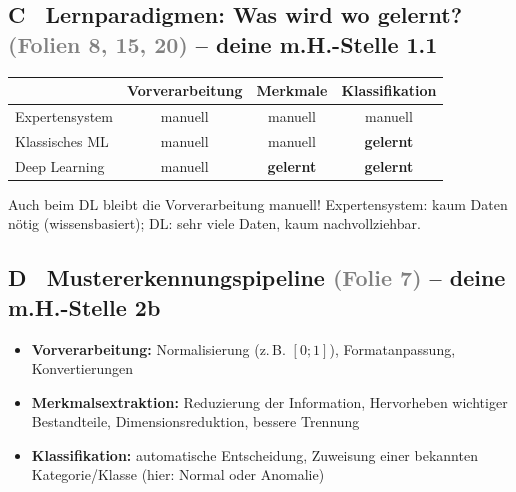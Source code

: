 \documentclass[10pt,a4paper]{article}
\newcommand{\folie}[1]{\textcolor{gray}{\footnotesize(#1)}}
\begin{document}
\subsection*{C \ Lernparadigmen: Was wird wo gelernt? \folie{Folien 8, 15, 20} -- deine m.H.-Stelle 1.1}

\renewcommand{\arraystretch}{1.2}
\begin{center}
\begin{tabular}{|p{3.4cm}|c|c|c|}
\hline
 & \textbf{Vorverarbeitung} & \textbf{Merkmale} & \textbf{Klassifikation} \\
\hline
Expertensystem & manuell & manuell & manuell \\
Klassisches ML & manuell & manuell & \textbf{gelernt} \\
Deep Learning & manuell & \textbf{gelernt} & \textbf{gelernt} \\
\hline
\end{tabular}
\end{center}
{\footnotesize Auch beim DL bleibt die Vorverarbeitung manuell! Expertensystem: kaum Daten nötig (wissensbasiert); DL: sehr viele Daten, kaum nachvollziehbar.}

\subsection*{D \ Mustererkennungspipeline \folie{Folie 7} -- deine m.H.-Stelle 2b}
\begin{itemize}
  \item \textbf{Vorverarbeitung:} Normalisierung (z.\,B. $[0;1]$), Formatanpassung, Konvertierungen
  \item \textbf{Merkmalsextraktion:} Reduzierung der Information, Hervorheben wichtiger Bestandteile, Dimensionsreduktion, bessere Trennung
  \item \textbf{Klassifikation:} automatische Entscheidung, Zuweisung einer bekannten Kategorie/Klasse (hier: Normal oder Anomalie)
\end{itemize}
\end{document}
